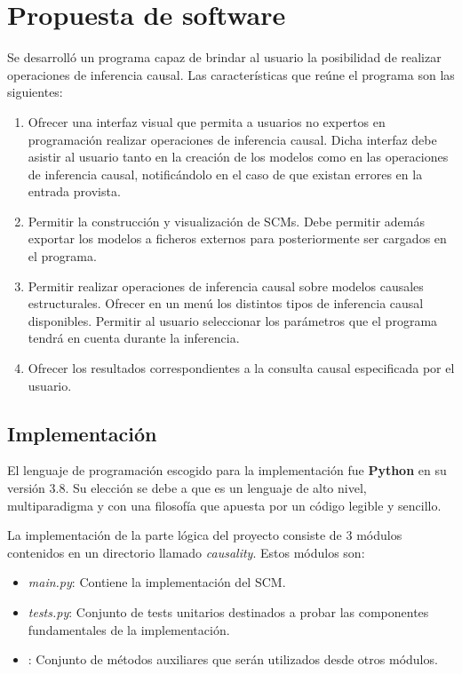 \chapter{Propuesta de software}

Se desarrolló un programa capaz de brindar al usuario la posibilidad de realizar operaciones de inferencia causal. Las características que reúne el programa son las siguientes:
\begin{enumerate}
	\item Ofrecer una interfaz visual que permita a usuarios no expertos en programación realizar operaciones de inferencia causal. Dicha interfaz debe asistir al usuario tanto en la creación de los modelos como en las operaciones de inferencia causal, notificándolo en el caso de que existan errores en la entrada provista. 
	\item Permitir la construcción y visualización de SCMs. Debe permitir además exportar los modelos a ficheros externos para posteriormente ser cargados en el programa.
	\item Permitir realizar operaciones de inferencia causal sobre modelos causales estructurales. Ofrecer en un menú los distintos tipos de inferencia causal disponibles. Permitir al usuario seleccionar los parámetros que el programa tendrá en cuenta durante la inferencia.
	\item Ofrecer los resultados correspondientes a la consulta causal especificada por el usuario.
\end{enumerate}

\section{Implementación}		
El lenguaje de programación escogido para la implementación fue \textbf{Python} en su versión $3.8$. Su elección se debe a que es un lenguaje de alto nivel, multiparadigma  y con una filosofía que apuesta por un código legible y sencillo.

La implementación de la parte lógica del proyecto consiste de 3 módulos contenidos en un directorio llamado \textit{causality}. Estos módulos son:
\begin{itemize}
	\item \textit{main.py}: Contiene la implementación del SCM.
	\item \textit{tests.py}: Conjunto de tests unitarios destinados a probar las componentes fundamentales de la implementación.
	\item {}: Conjunto de métodos auxiliares que serán utilizados desde otros módulos.
\end{itemize}

